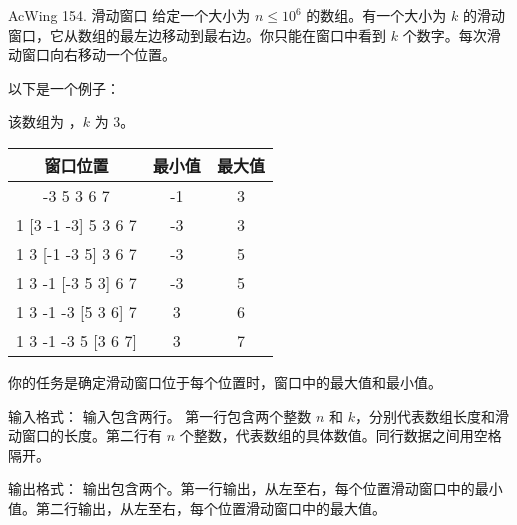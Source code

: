 \begin{titledbox}{AcWing 154. 滑动窗口}
    给定一个大小为 $n \le 10^6$ 的数组。有一个大小为 $k$ 的滑动窗口，它从数组的最左边移动到最右边。你只能在窗口中看到 $k$ 个数字。每次滑动窗口向右移动一个位置。

    以下是一个例子：

    该数组为 \inlinecode{[1 3 -1 -3 5 3 6 7]}，$k$ 为 $3$。

    \begin{tabular}{|c|c|c|}
        \hline
        窗口位置               & 最小值 & 最大值 \\ \hline
        [1 3  -1] -3 5 3 6 7 & -1  & 3   \\ \hline
        1 [3  -1  -3] 5 3 6 7  & -3  & 3   \\ \hline
        1 3 [-1  -3 5] 3 6 7 & -3  & 5   \\ \hline
        1 3  -1 [-3 5 3] 6 7 & -3  & 5   \\ \hline
        1 3  -1  -3 [5 3 6] 7  & 3   & 6   \\ \hline
        1 3  -1  -3 5 [3 6 7]  & 3   & 7   \\ \hline
    \end{tabular}

    你的任务是确定滑动窗口位于每个位置时，窗口中的最大值和最小值。

    输入格式：
    输入包含两行。 第一行包含两个整数 $n$ 和 $k$，分别代表数组长度和滑动窗口的长度。第二行有 $n$ 个整数，代表数组的具体数值。同行数据之间用空格隔开。

    输出格式：
    输出包含两个。第一行输出，从左至右，每个位置滑动窗口中的最小值。第二行输出，从左至右，每个位置滑动窗口中的最大值。

    \begin{inputblock}
         \\
    \end{inputblock}
    \begin{outputblock}
         \\
    \end{outputblock}
\end{titledbox}

